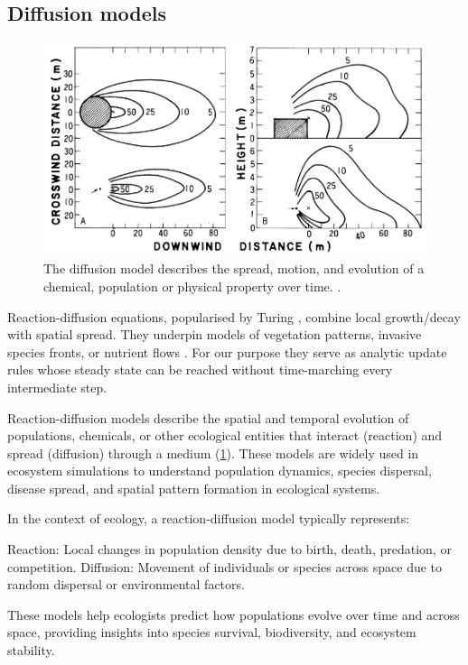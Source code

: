 \subsection{Diffusion models}

\begin{figure}
    \includegraphics[]{diffusion-example-Okubo2001.png}
    \caption{The diffusion model describes the spread, motion, and evolution of a chemical, population or physical property over time. \cite{Okubo2001}.}
    \label{fig:diffusion-model-teaser}
\end{figure}

Reaction-diffusion equations, popularised by Turing \cite{Turing1952}, combine local growth/decay with spatial spread. They underpin models of vegetation patterns, invasive species fronts, or nutrient flows \cite{Cosner2008}. For our purpose they serve as analytic update rules whose steady state can be reached without time-marching every intermediate step.

Reaction-diffusion models describe the spatial and temporal evolution of populations, chemicals, or other ecological entities that interact (reaction) and spread (diffusion) through a medium (\cref{fig:diffusion-model-teaser}). These models are widely used in ecosystem simulations to understand population dynamics, species dispersal, disease spread, and spatial pattern formation in ecological systems.

In the context of ecology, a reaction-diffusion model typically represents:
\begin{Itemize}
    \Item{} Reaction: Local changes in population density due to birth, death, predation, or competition.
    \Item{} Diffusion: Movement of individuals or species across space due to random dispersal or environmental factors.
\end{Itemize}
These models help ecologists predict how populations evolve over time and across space, providing insights into species survival, biodiversity, and ecosystem stability.

